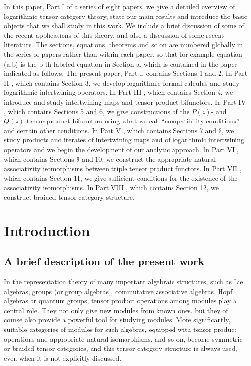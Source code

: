 \documentclass[12pt]{article}
\begin{document}
In this paper, Part I of a series of eight papers, we give a detailed
overview of logarithmic tensor category theory, state our main results
and introduce the basic objects that we shall study in this work.  We
include a brief discussion of some of the recent applications of this
theory, and also a discussion of some recent literature.  The
sections, equations, theorems and so on are numbered globally in the
series of papers rather than within each paper, so that for example
equation (a.b) is the b-th labeled equation in Section a, which is
contained in the paper indicated as follows: The present paper, Part
I, contains Sections 1 and 2.  In Part II \cite{HLZ2}, which contains
Section 3, we develop logarithmic formal calculus and study
logarithmic intertwining operators.  In Part III \cite{HLZ3}, which
contains Section 4, we introduce and study intertwining maps and
tensor product bifunctors.  In Part IV \cite{HLZ4}, which contains
Sections 5 and 6, we give constructions of the $P(z)$- and
$Q(z)$-tensor product bifunctors using what we call ``compatibility
conditions'' and certain other conditions.  In Part V \cite{HLZ5},
which contains Sections 7 and 8, we study products and iterates of
intertwining maps and of logarithmic intertwining operators and we
begin the development of our analytic approach.  In Part VI
\cite{HLZ6}, which contains Sections 9 and 10, we construct the
appropriate natural associativity isomorphisms between triple tensor
product functors.  In Part VII \cite{HLZ7}, which contains Section 11,
we give sufficient conditions for the existence of the associativity
isomorphisms.  In Part VIII \cite{HLZ8}, which contains Section 12, we
construct braided tensor category structure.

\renewcommand{\theequation}{\thesection.\arabic{equation}}
\renewcommand{\therema}{\thesection.\arabic{rema}}
\setcounter{equation}{0}
\setcounter{rema}{0}

\section{Introduction}

\subsection*{A brief description of the present work}

In the representation theory of many important algebraic structures,
such as Lie algebras, groups (or group algebras), commutative
associative algebras, Hopf algebras or quantum groups, tensor product
operations among modules play a central role.  They not only give new
modules from known ones, but they of course also provide a powerful
tool for studying modules.  More significantly, suitable categories of
modules for such algebras, equipped with tensor product operations and
appropriate natural isomorphisms, and so on, become symmetric or
braided tensor categories, and this tensor category structure is
always used, even when it is not explicitly discussed.
\end{document}
